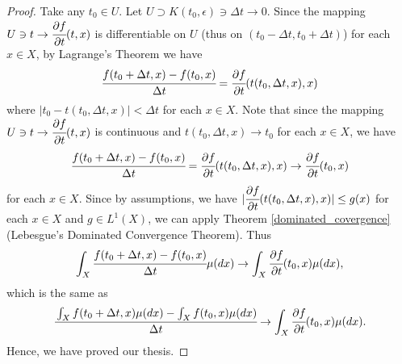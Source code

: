 \documentclass[main.tex]{subfiles}
\begin{document}
\begin{proof}
Take any $t_0 \in U$. Let $U \supset K(t_0, \epsilon) \ni \Delta t \to 0.$
Since the mapping $U\ni t \to \cfrac{\partial f}{\partial t}(t,x)$ is differentiable on $U$ (thus on $(t_0 - \Delta t, t_0 + \Delta t)$) for each $x\in X$, by Lagrange's Theorem we have
\begin{equation}
    \cfrac{f(t_0 + \Delta t, x) - f(t_0, x)}{\Delta t} =
    \cfrac{\partial f}{\partial t}(t(t_0, \Delta t, x), x)
\end{equation}
where $|t_0 - t(t_0, \Delta t, x)| < \Delta t$ for each $x\in X$.
Note that since the mapping $U\ni t \to \cfrac{\partial f}{\partial t}(t,x)$ is continuous and $t(t_0, \Delta t, x) \to t_0$ for each $x\in X$, we have
\begin{equation}
    \cfrac{f(t_0 + \Delta t, x) - f(t_0, x)}{\Delta t} =
    \cfrac{\partial f}{\partial t}(t(t_0, \Delta t, x), x) \to \cfrac{\partial f}{\partial t}(t_0, x)
\end{equation}
for each $x\in X$.
Since by assumptions, we have $|\cfrac{\partial f}{\partial t}(t(t_0, \Delta t, x), x)| \leq g(x)$ for each $x\in X$ and $g\in L^1(X)$, we can apply Theorem \ref{dominated_covergence} (Lebesgue's Dominated Convergence Theorem).
Thus
\begin{equation}
    \int_X  \cfrac{f(t_0 + \Delta t, x) - f(t_0, x)}{\Delta t} \mu(dx) \to \int_X \cfrac{\partial f}{\partial t}(t_0, x) \mu(dx),
\end{equation}
which is the same as
\begin{equation}
    \cfrac{\int_X f(t_0 + \Delta t, x) \mu(dx) - \int_X f(t_0, x) \mu(dx)}{\Delta t}  \to \int_X \cfrac{\partial f}{\partial t}(t_0, x) \mu(dx).
\end{equation}
Hence, we have proved our thesis.
\end{proof}
\end{document}
